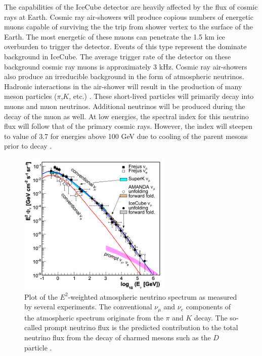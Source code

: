 \documentclass{gatech-thesis}
\begin{document}
The capabilities of the IceCube detector are heavily affected by the flux of cosmic rays at Earth. Cosmic ray air-showers will produce copious numbers of energetic muons capable of surviving the the trip from shower vertex to the surface of the Earth. The most energetic of these muons can penetrate the 1.5 km ice overburden to trigger the detector. Events of this type represent the dominate background in IceCube. The average trigger rate of the detector on these background cosmic ray muons is approximately 3 kHz. Cosmic ray air-showers also produce an irreducible background in the form of atmospheric neutrinos. Hadronic interactions in the air-shower will result in the production of many meson particles ($\pi$,$K$, etc.) \cite{1995PhR...258..173G}. These short-lived particles will primarily decay into muons and muon neutrinos. Additional neutrinos will be produced during the decay of the muon as well. At low energies, the spectral index for this neutrino flux will follow that of the primary cosmic rays. However, the index will steepen to value of 3.7 for energies above 100 GeV due to cooling of the parent mesons prior to decay \cite{1995PhR...258..173G}.
\begin{figure}[ht]
  \begin{center}
    \includegraphics[width=0.65\textwidth,keepaspectratio]{atmospheric_nu_spectrum.png}
  \end{center}
  \caption[Atmospheric Neutrino Spectrum]{Plot of the $E^{2}$-weighted atmospheric neutrino spectrum as measured by several experiments. The conventional $\nu_{\mu}$ and $\nu_e$ components of the atmospheric spectrum originate from the $\pi$ and $K$ decay. The so-called prompt neutrino flux is the predicted contribution to the total neutrino flux from the decay of charmed mesons such as the $D$ particle \cite{2012arXiv1204.5379A}.}
  \label{fig:atmo_spec}
\end{figure}
\end{document}
